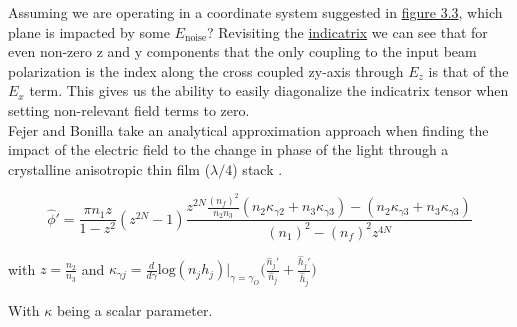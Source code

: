 \noindent Assuming we are operating in a coordinate system suggested in \hyperref[fig:algaas_coords]{figure 3.3}, which plane is impacted by some $E_\mathrm{noise}$? Revisiting the \hyperref[eq:zindicatrix]{indicatrix} we can see that for even non-zero z and y components that the only coupling to the input beam polarization is the index along the cross coupled zy-axis through $E_z$ is that of the $E_x$ term. This gives us the ability to easily diagonalize the indicatrix tensor when setting non-relevant field terms to zero.
\\
Fejer and Bonilla take an analytical approximation approach when finding the impact of the electric field to the change in phase of the light through a crystalline anisotropic thin film ($\lambda/4$) stack \cite{bonillafejer}.

\begin{equation}
\hat{\phi}' = \frac{\pi n_1 z}{1-z^2}(z^{2N} -1) \frac{z^{2N} \frac{(n_f)^2}{n_2 n_3}(n_2 \kappa_{\gamma 2} + n_3\kappa_{\gamma 3}) - (n_2 \kappa_{\gamma 3} + n_3\kappa_{\gamma 3})}{(n_1)^2 -(n_f)^2 z^{4N}}
\end{equation}

with $z = \frac{n_2}{n_3}$
and
$
\kappa_{\gamma j} = \frac{d}{d \gamma} \mathrm{log}(n_j h_j)|_{\gamma =\gamma_{O}} \bigg(\frac{\hat{n}_j'}{\hat{n}_j} +\frac{\hat{h}_j'}{\hat{h}_j} \bigg)
$

With $\kappa$ being a scalar parameter.

